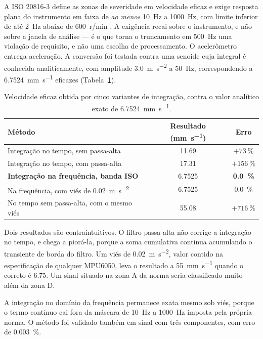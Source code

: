 \documentclass[11pt,a4paper]{article}
\begin{document}
A ISO 20816-3 define as zonas de severidade em velocidade eficaz e exige resposta plana
do instrumento em faixa de \emph{ao menos} \SI{10}{\hertz} a \SI{1000}{\hertz}, com limite
inferior de até \SI{2}{\hertz} abaixo de \num{600}~r/min \cite{iso10816,iso20816}. A exigência
recai sobre o instrumento, e não sobre a janela de análise --- é o que torna o truncamento
em \SI{500}{\hertz} uma violação de requisito, e não uma escolha de processamento. O acelerômetro entrega aceleração. A conversão foi
testada contra uma senoide cuja integral é conhecida analiticamente, com amplitude
\SI{3,0}{\meter\per\second\squared} a \SI{50}{\hertz}, correspondendo a
\SI{6,7524}{\milli\meter\per\second} eficazes (Tabela~\ref{tab:integracao}).

\begin{table}[!htb]
\centering
\caption{Velocidade eficaz obtida por cinco variantes de integração, contra o valor
analítico exato de \SI{6,7524}{\milli\meter\per\second}.}
\label{tab:integracao}
\small
\begin{tabular}{lcc}
\toprule
Método & Resultado (\si{\milli\meter\per\second}) & Erro \\
\midrule
Integração no tempo, sem passa-alta          & \num{11,69}  & $+\SI{73}{\percent}$ \\
Integração no tempo, com passa-alta          & \num{17,31}  & $+\SI{156}{\percent}$ \\
\textbf{Integração na frequência, banda ISO} & \num{6,7525} & \textbf{\SI{0,0}{\percent}} \\
Na frequência, com viés de \SI{0,02}{\meter\per\second\squared} & \num{6,7525} & \SI{0,0}{\percent} \\
No tempo sem passa-alta, com o mesmo viés    & \num{55,08}  & $+\SI{716}{\percent}$ \\
\bottomrule
\end{tabular}
\end{table}

Dois resultados são contraintuitivos. O filtro passa-alta não corrige a integração no
tempo, e chega a piorá-la, porque a soma cumulativa continua acumulando o transiente de
borda do filtro. Um viés de \SI{0,02}{\meter\per\second\squared}, valor contido na
especificação de qualquer MPU6050, leva o resultado a \SI{55}{\milli\meter\per\second}
quando o correto é \num{6,75}. Um sinal situado na zona A da norma seria classificado
muito além da zona D.

A integração no domínio da frequência permanece exata mesmo sob viés, porque o termo
contínuo cai fora da máscara de \SI{10}{\hertz} a \SI{1000}{\hertz} imposta pela própria
norma. O método foi validado também em sinal com três componentes, com erro de
\SI{0,003}{\percent}.
\end{document}
